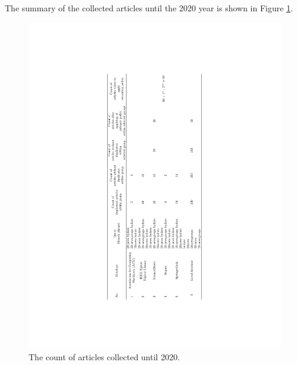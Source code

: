 \documentclass[
]{article}
\begin{document}
The summary of the collected articles until the 2020 year is shown in Figure \ref{fig:sumUntil2020}.

\begin{figure}

{\centering \includegraphics[width=1\linewidth]{../../tables/latex/table-data-to-review-2-1} 

}

\caption{The count of articles collected until 2020.}\label{fig:sumUntil2020}
\end{figure}
\end{document}

